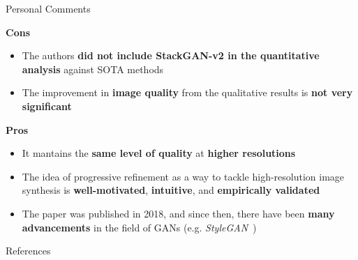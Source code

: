 \documentclass{beamer}
\begin{document}
\begin{frame}{Personal Comments}
    
    \begin{block}{\textbf{Cons}}
        \begin{itemize}
            \item The authors \textbf{did not include StackGAN-v2 in the quantitative analysis} against SOTA methods
            \item The improvement in \textbf{image quality} from the qualitative results is \textbf{not very significant}
        \end{itemize}
    \end{block}
    
    \begin{block}{\textbf{Pros}}
        \begin{itemize}
            \item It mantains the \textbf{same level of quality} at \textbf{higher resolutions}
            \item The idea of progressive refinement as a way to tackle high-resolution image synthesis is \textbf{well-motivated}, \textbf{intuitive}, and \textbf{empirically validated}
        \end{itemize}
    \end{block}
    \begin{itemize}
        \item The paper was published in 2018, and since then, there have been \textbf{many advancements} in the field of GANs (e.g. \textit{StyleGAN}~\cite{stylegan})
    \end{itemize}
\end{frame}

\begin{frame}[allowframebreaks]{References}
    \nocite{*} %
     
    
\end{frame}
\end{document}
